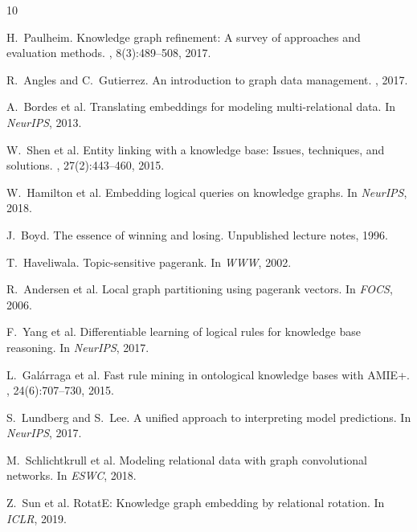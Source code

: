 \documentclass[10pt,twocolumn]{article}
\begin{document}

\begin{thebibliography}{10}

H.~Paulheim.
\newblock Knowledge graph refinement: A survey of approaches and evaluation methods.
, 8(3):489--508, 2017.

R.~Angles and C.~Gutierrez.
\newblock An introduction to graph data management.
, 2017.

A.~Bordes et al.
\newblock Translating embeddings for modeling multi-relational data.
\newblock In {\em NeurIPS}, 2013.

W.~Shen et al.
\newblock Entity linking with a knowledge base: Issues, techniques, and solutions.
, 27(2):443--460, 2015.

W.~Hamilton et al.
\newblock Embedding logical queries on knowledge graphs.
\newblock In {\em NeurIPS}, 2018.

J.~Boyd.
\newblock The essence of winning and losing.
\newblock Unpublished lecture notes, 1996.

T.~Haveliwala.
\newblock Topic-sensitive pagerank.
\newblock In {\em WWW}, 2002.

R.~Andersen et al.
\newblock Local graph partitioning using pagerank vectors.
\newblock In {\em FOCS}, 2006.

F.~Yang et al.
\newblock Differentiable learning of logical rules for knowledge base reasoning.
\newblock In {\em NeurIPS}, 2017.

L.~Galárraga et al.
\newblock Fast rule mining in ontological knowledge bases with AMIE+.
, 24(6):707--730, 2015.

S.~Lundberg and S.~Lee.
\newblock A unified approach to interpreting model predictions.
\newblock In {\em NeurIPS}, 2017.

M.~Schlichtkrull et al.
\newblock Modeling relational data with graph convolutional networks.
\newblock In {\em ESWC}, 2018.

Z.~Sun et al.
\newblock RotatE: Knowledge graph embedding by relational rotation.
\newblock In {\em ICLR}, 2019.


\end{thebibliography}
\end{document}
